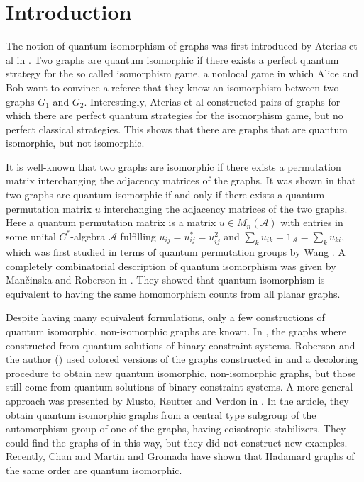 \section{Introduction}
The notion of quantum isomorphism of graphs was first introduced by Aterias et al in \cite{AMRSSV}. Two graphs are quantum isomorphic if there exists a perfect quantum strategy for the so called isomorphism game, a nonlocal game in which Alice and Bob want to convince a referee that they know an isomorphism between two graphs $G_1$ and $G_2$. Interestingly, Aterias et al constructed pairs of graphs for which there are perfect quantum strategies for the isomorphism game, but no perfect classical strategies. This shows that there are graphs that are quantum isomorphic, but not isomorphic. 

It is well-known that two graphs are isomorphic if there exists a permutation matrix interchanging the adjacency matrices of the graphs. It was shown in \cite{AMRSSV} that two graphs are quantum isomorphic if and only if there exists a quantum permutation matrix $u$ interchanging the adjacency matrices of the two graphs. Here a quantum permutation matrix is a matrix $u\in M_n(\mathcal{A})$ with entries in some unital $C^*$-algebra $\mathcal{A}$ fulfilling $u_{ij}=u_{ij}^*=u_{ij}^2$ and $\sum_k u_{ik}=1_{\mathcal{A}}=\sum_k u_{ki}$, which was first studied in terms of quantum permutation groups by Wang \cite{WanSn}.
A completely combinatorial description of quantum isomorphism was given by Man\v{c}inska and Roberson in \cite{MRplanar}. They showed that quantum isomorphism is equivalent to having the same homomorphism counts from all planar graphs. 

Despite having many equivalent formulations, only a few constructions of quantum isomorphic, non-isomorphic graphs are known. In \cite{AMRSSV}, the graphs where constructed from quantum solutions of binary constraint systems. Roberson and the author (\cite{RS}) used colored versions of the graphs constructed in \cite{AMRSSV} and a decoloring procedure to obtain new quantum isomorphic, non-isomorphic graphs, but those still come from quantum solutions of binary constraint systems. 
A more general approach was presented by Musto, Reutter and Verdon in \cite{MRV}. In the article, they obtain quantum isomorphic graphs from a central type subgroup of the automorphism group of one of the graphs, having coisotropic stabilizers. They could find the graphs of \cite{AMRSSV} in this way, but they did not construct new examples. Recently, Chan and Martin \cite{CM} and Gromada \cite{G} have shown that Hadamard graphs of the same order are quantum isomorphic. 

